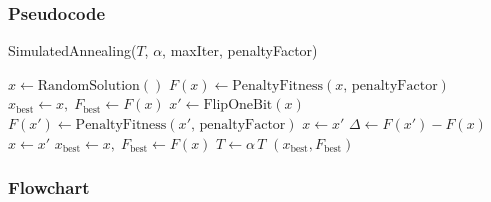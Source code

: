 \documentclass[12pt]{article}
\begin{document}
\subsubsection*{Pseudocode}
\begin{algorithm}[htbp]
\caption{SimulatedAnnealing(\(T\), \(\alpha\), maxIter, penaltyFactor)}
\begin{algorithmic}[1]
  \State \(x \gets \text{RandomSolution}()\)
  \State \(F(x) \gets \text{PenaltyFitness}(x,\,\text{penaltyFactor})\)
  \State \(x_{\text{best}} \gets x,\; F_{\text{best}} \gets F(x)\)
    \State \(x' \gets \text{FlipOneBit}(x)\)
    \State \(F(x') \gets \text{PenaltyFitness}(x',\,\text{penaltyFactor})\)
      \State \(x \gets x'\)
    \Else
      \State \(\Delta \gets F(x') - F(x)\)
        \State \(x \gets x'\)
      \EndIf
    \EndIf
      \State \(x_{\text{best}} \gets x,\; F_{\text{best}} \gets F(x)\)
    \EndIf
    \State \(T \gets \alpha \, T\)
  \EndFor
  \State \Return \((x_{\text{best}}, F_{\text{best}})\)
\end{algorithmic}
\end{algorithm}

\newpage

\subsubsection*{Flowchart}
\end{document}
